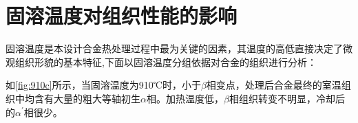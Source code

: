\section{固溶温度对组织性能的影响}
固溶温度是本设计\ti 合金热处理过程中最为关键的因素，其温度的高低直接决定了微观组织形貌的基本特征,下面以固溶温度分组依据对合金的组织进行分析：

如\ref{fig:910c}所示，当固溶温度为910℃时，小于$\beta$相变点，处理后合金最终的室温组织中均含有大量的粗大等轴初生$\alpha$相。加热温度低，$\beta$相组织转变不明显，冷却后的$\alpha^\prime$相很少。

\begin{figure}[htbp]
	\centering
\end{figure}
